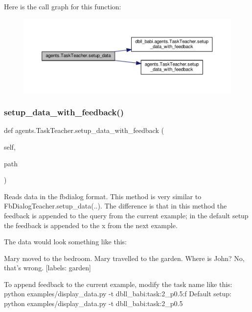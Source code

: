Here is the call graph for this function\+:
\nopagebreak
\begin{figure}[H]
\begin{center}
\leavevmode
\includegraphics[width=350pt]{classagents_1_1TaskTeacher_aa4657ff478d0f6241272311b3e79351e_cgraph}
\end{center}
\end{figure}
\mbox{\label{classagents_1_1TaskTeacher_a5905922070928e411cec76cda82281ec}} 
\subsubsection{\texorpdfstring{setup\+\_\+data\+\_\+with\+\_\+feedback()}{setup\_data\_with\_feedback()}}
{\footnotesize\ttfamily def agents.\+Task\+Teacher.\+setup\+\_\+data\+\_\+with\+\_\+feedback (\begin{DoxyParamCaption}\item[{}]{self,  }\item[{}]{path }\end{DoxyParamCaption})}

\begin{DoxyVerb}Reads data in the fbdialog format.
This method is very similar to FbDialogTeacher.setup_data(..).
The difference is that in this method the feedback is appended to the query
from the current example; in the default setup the feedback is appended to
the x from the next example.

The data would look something like this:

Mary moved to the bedroom.
Mary travelled to the garden.
Where is John?
No, that's wrong.
[labels: garden]

To append feedback to the current example, modify the task name like this:
  python examples/display_data.py -t dbll_babi:task:2_p0.5:f
Default setup:
  python examples/display_data.py -t dbll_babi:task:2_p0.5\end{DoxyVerb}
 

